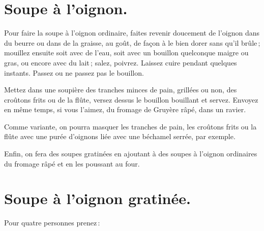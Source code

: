 \section*{\centering Soupe à l'oignon.}

Pour faire la soupe à l'oignon ordinaire, faites revenir doucement de l'oignon
dans du beurre ou dans de la graisse, au goût, de façon à le bien dorer sans
qu'il brûle ; mouillez ensuite soit avec de l’eau, soit avec un bouillon
quelconque maigre ou gras, ou encore avec du lait ; salez, poivrez. Laissez
cuire pendant quelques instants. Passez ou ne passez pas le bouillon.

Mettez dans une soupière des tranches minces de pain, grillées ou non, des
croûtons frits ou de la flûte, versez dessus le bouillon bouillant et servez.
Envoyez en même temps, si vous l'aimez, du fromage de Gruyère râpé, dans un
ravier.

\sk

Comme variante, on pourra masquer les tranches de pain, les croûtons frits ou
la flûte avec une purée d'oignons liée avec une béchamel serrée, par exemple.

\sk

Enfin, on fera des soupes gratinées en ajoutant à des soupes à l'oignon
ordinaires du fromage râpé et en les poussant au four.

\section*{\centering Soupe à l'oignon gratinée.}

Pour quatre personnes prenez :

\medskip

